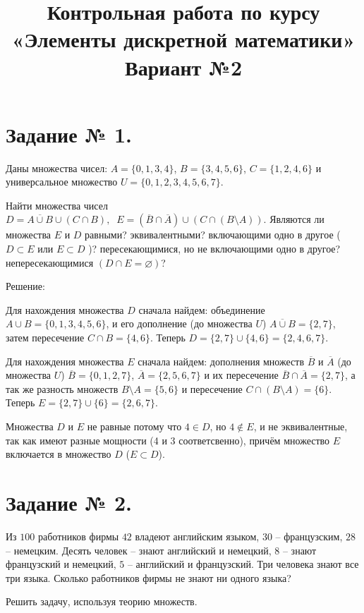 \documentclass[fleqn]{article}
\title{Контрольная работа по курсу «Элементы дискретной математики»\\
Вариант №2}
\begin{document}
\date{}
\maketitle
\section*{Задание № 1.}

Даны множества чисел: $A=\{0,1,3,4\}$, $B=\{3,4,5,6\}$, $C=\{1,2,4,6\}$ и универсальное множество $U=\{0,1,2,3,4,5,6,7\}$.

Найти множества чисел $D=\overline{A\cup B}\cup (C\cap B),\;\; E=(\overline{B}\cap \overline{A})\cup (C\cap(B\setminus A))$. Являются ли множества $E$ и $D$ равными? эквивалентными? включающими одно в другое ( $D \subset E$ или $E \subset D$ )? пересекающимися, но не включающими одно в другое? непересекающимися $( D \cap E = \varnothing )$?

\begin{center}Решение:\end{center}

Для нахождения множества $D$ сначала найдем: объединение $A\cup B=\{0,1,3,4,5,6\}$, и его дополнение (до множества $U$) $\overline{A\cup B}=\{2,7\}$, затем пересечение $C\cap B=\{4,6\}$. Теперь $D=\{2,7\}\cup\{4,6\}=\{2,4,6,7\}$.

Для нахождения множества $E$ сначала найдем: дополнения множеств $\overline{B}$ и $\overline{A}$ (до множества $U$) $\overline{B}=\{0,1,2,7\}$, $\overline{A}=\{2,5,6,7\}$ и их пересечение $\overline{B}\cap\overline{A}=\{2,7\}$, а так же разность множеств $B\setminus A=\{5,6\}$ и пересечение $C\cap(B\setminus A)=\{6\}$. Теперь $E=\{2,7\}\cup\{6\}=\{2,6,7\}$.

Множества $D$ и $E$ не равные потому что $4\in D$, но $4\notin E$, и не эквивалентные, так как имеют разные мощности (4 и 3 соответсвенно), причём множество $E$ включается в множество $D$ ($E \subset D$).

\section*{Задание № 2.}

Из $100$ работников фирмы $42$ владеют английским языком, $30$ – французским, $28$ – немецким. Десять человек – знают английский и немецкий, $8$ – знают французский и немецкий, $5$ – английский и французский. Три человека знают все три языка. Сколько работников фирмы не знают ни одного языка?

Решить задачу, используя теорию множеств.
\end{document}
